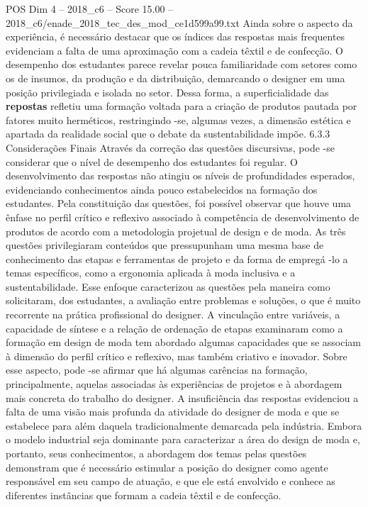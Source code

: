 \begin{textsample}{POS Dim 4 – 2018\_c6 – Score 15.00 – 2018\_c6/enade\_2018\_tec\_des\_mod\_ce1d599a99.txt}
Ainda sobre o aspecto da experiência, é necessário destacar que os índices das respostas mais frequentes evidenciam a falta de uma aproximação com a cadeia têxtil e de confecção.
O desempenho dos estudantes parece revelar pouca familiaridade com setores como os de insumos, da produção e da distribuição, demarcando o designer em uma posição privilegiada e isolada no setor.
Dessa forma, a superficialidade das \textbf{repostas} refletiu uma formação voltada para a criação de produtos pautada por fatores muito herméticos, restringindo -se, algumas vezes, a dimensão estética e apartada da realidade social que o debate da sustentabilidade impõe. 6.3.3 Considerações Finais Através da correção das questões discursivas, pode -se considerar que o nível de desempenho dos estudantes foi regular.
O desenvolvimento das respostas não atingiu os níveis de profundidades esperados, evidenciando conhecimentos ainda pouco estabelecidos na formação dos estudantes.
Pela constituição das questões, foi possível observar que houve uma ênfase no perfil crítico e reflexivo associado à competência de desenvolvimento de produtos de acordo com a metodologia projetual de design e de moda.
As três questões privilegiaram conteúdos que pressupunham uma mesma base de conhecimento das etapas e ferramentas de projeto e da forma de empregá -lo a temas específicos, como a ergonomia aplicada à moda inclusiva e a sustentabilidade.
Esse enfoque caracterizou as questões pela maneira como solicitaram, dos estudantes, a avaliação entre problemas e soluções, o que é muito recorrente na prática profissional do designer.
A vinculação entre variáveis, a capacidade de síntese e a relação de ordenação de etapas examinaram como a formação em design de moda tem abordado algumas capacidades que se associam à dimensão do perfil crítico e reflexivo, mas também criativo e inovador.
Sobre esse aspecto, pode -se afirmar que há algumas carências na formação, principalmente, aquelas associadas às experiências de projetos e à abordagem mais concreta do trabalho do designer.
A insuficiência das respostas evidenciou a falta de uma visão mais profunda da atividade do designer de moda e que se estabelece para além daquela tradicionalmente demarcada pela indústria.
Embora o modelo industrial seja dominante para caracterizar a área do design de moda e, portanto, seus conhecimentos, a abordagem dos temas pelas questões demonstram que é necessário estimular a posição do designer como agente responsável em seu campo de atuação, e que ele está envolvido e conhece as diferentes instâncias que formam a cadeia têxtil e de confecção.

\end{textsample}
